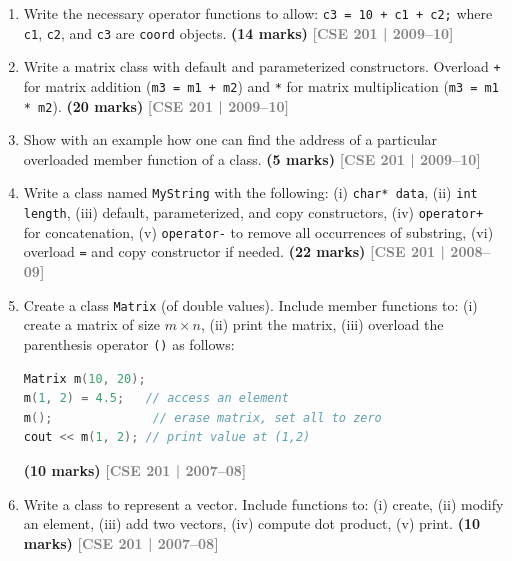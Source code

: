 \documentclass[12pt,a3paper]{article}
\newcommand{\yr}[1]{\hfill\textcolor{gray}{\small\textbf{[#1]}}}
\newcommand{\mk}[1]{\textcolor{orange!70!black}{\small\textbf{(#1 marks)}}}
\begin{document}
\begin{enumerate}




\item Write the necessary operator functions to allow: \texttt{c3 = 10 + c1 + c2;} where \texttt{c1}, \texttt{c2}, and \texttt{c3} are \texttt{coord} objects. \mk{14}
\yr{CSE 201 | 2009--10}





\item Write a matrix class with default and parameterized constructors. Overload \texttt{+} for matrix addition (\texttt{m3 = m1 + m2}) and \texttt{*} for matrix multiplication (\texttt{m3 = m1 * m2}). \mk{20}
\yr{CSE 201 | 2009--10}






\item Show with an example how one can find the address of a particular overloaded member function of a class. \mk{5}
\yr{CSE 201 | 2009--10}





\item Write a class named \texttt{MyString} with the following: (i) \texttt{char* data}, (ii) \texttt{int length}, (iii) default, parameterized, and copy constructors, (iv) \texttt{operator+} for concatenation, (v) \texttt{operator-} to remove all occurrences of substring, (vi) overload \texttt{=} and copy constructor if needed. \mk{22}
\yr{CSE 201 | 2008--09}




\item Create a class \texttt{Matrix} (of double values). Include member functions to: (i) create a matrix of size $m \times n$, (ii) print the matrix, (iii) overload the parenthesis operator \texttt{()} as follows:
\begin{lstlisting}[language=C++]
Matrix m(10, 20);
m(1, 2) = 4.5;   // access an element
m();              // erase matrix, set all to zero
cout << m(1, 2); // print value at (1,2)
\end{lstlisting}
\mk{10}
\yr{CSE 201 | 2007--08}






\item Write a class to represent a vector. Include functions to: (i) create, (ii) modify an element, (iii) add two vectors, (iv) compute dot product, (v) print. \mk{10}
\yr{CSE 201 | 2007--08}





\end{enumerate}
\newpage
\end{document}
